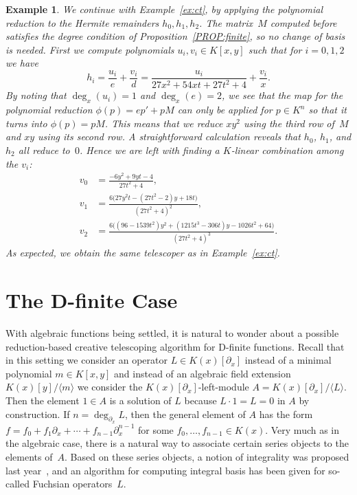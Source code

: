 \documentclass{sig-alternate}
\newtheorem{example}[theorem]{Example}
\def\<#1>{\langle#1\rangle}
\begin{document}
\begin{example}
We continue with Example~\ref{ex:ct}, by applying the polynomial reduction
to the Hermite remainders $h_0,h_1,h_2$. The matrix~$M$ computed before
satisfies the degree condition of Proposition~\ref{PROP:finite}, so no
change of basis is needed. First we compute polynomials
$u_i,v_i\in K[x,y]$ such that for $i=0,1,2$ we have
\[
  h_i = \frac{u_i}{e} + \frac{v_i}{d} = \frac{u_i}{27x^2+54xt+27t^2+4} + \frac{v_i}{x}.
\]
By noting that $\deg_x(u_i)=1$ and $\deg_x(e)=2$, we see that the
map for the polynomial reduction $\phi(p) = ep' + pM$ can only be
applied for $p\in K^n$ so that it turns into $\phi(p) = pM$.
This means that we reduce $xy^2$ using the third row of~$M$ and
$xy$ using its second row. A straightforward calculation reveals
that $h_0$, $h_1$, and $h_2$ all reduce to~$0$. Hence we are left
with finding a $K$-linear combination among the $v_i$:
\begin{align*}
 v_0 &= \frac{-6y^2+9yt-4}{27t^2+4},\\
 v_1 &= \frac{6\bigl(27y^2t-(27t^2-2)y+18t\bigr)}{(27t^2+4)^2},\\
 v_2 &= \frac{6\bigl((96-1539t^2)y^2+(1215t^3-306t)y-1026t^2+64\bigr)}{(27t^2+4)^3}.
\end{align*}
As expected, we obtain the same telescoper as in Example~\ref{ex:ct}.
\end{example}



\section{The D-finite Case}

With algebraic functions being settled, it is natural to wonder about a possible
reduction-based creative telescoping algorithm for D-finite functions. Recall
that in this setting we consider an operator $L\in K(x)[\partial_x]$ instead of a minimal
polynomial $m\in K[x,y]$ and instead of an algebraic field extension
$K(x)[y]/\<m>$ we consider the $K(x)[\partial_x]$-left-module
$A=K(x)[\partial_x]/\<L>$. Then the element $1\in A$ is a solution of $L$
because $L\cdot 1=L=0$ in $A$ by construction. If $n=\deg_{\partial_x}L$, then
the general element of $A$ has the form
$f=f_0+f_1\partial_x+\cdots+f_{n-1}\partial_x^{n-1}$ for some
$f_0,\dots,f_{n-1}\in K(x)$. Very much as in the algebraic case, there is a natural way
to associate certain series objects to the elements of~$A$. Based on these
series objects, a notion of integrality was proposed last year~\cite{kauers15b}, and an
algorithm for computing integral basis has been given for so-called Fuchsian
operators~$L$.
\end{document}
